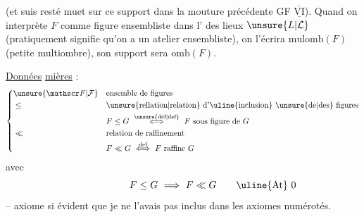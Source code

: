 (et  suis resté muet sur ce support dans la mouture précédente GF $\underline{\overline{\mathrm{VI}}}$). Quand on interprète $F$ comme figure ensembliste dans l' des lieux $\unsure{L|\mathcal L}$  (pratiquement  signifie qu'on a un atelier ensembliste), on l'écrira $\mathrm{mulomb}(F)$ (petite multiombre), son support sera $\mathrm{omb}(F)$.

\uline{Données} \uline{mières} :
\[
\left\{\begin{aligned}
&\unsure{\mathscr F|\mathcal F} &&\text{ensemble de figures}\\
&\leq &&\text{\unsure{rellation|relation} d'\uline{inclusion} \unsure{de|des} figures}\\
& &&F\leq G\ \overset{\text{\unsure{déf|def}}}{\Longleftrightarrow}\ F\ \text{sous figure de }G\\
&\ll &&\text{relation de raffinement}\\
& && F\ll G\ \overset{\text{def}}{\Longleftrightarrow}\ F\ \text{raffine }G
\end{aligned}\right.
\]
avec
\[
F\leq G\ \Longrightarrow\ F\ll G\tag*{\makebox[0pt][r]{\makebox[\displaywidth][l]{\uline{At} 0}}}
\]
-- axiome si évident que je ne l'avais pas inclus dans les axiomes numérotés.

